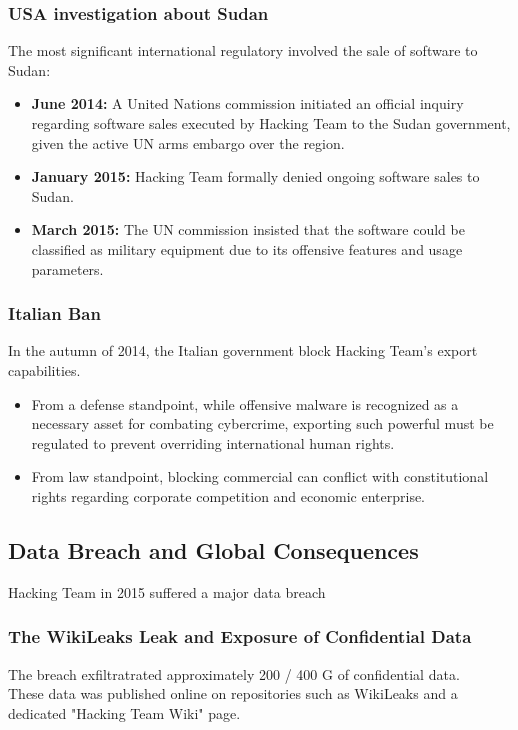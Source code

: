 \subsubsection*{USA investigation about Sudan}
The most significant international regulatory involved the sale of software to Sudan:
\begin{itemize}
    \item \textbf{June 2014:} A United Nations commission initiated an official inquiry regarding software sales executed by Hacking Team to the Sudan government, given the active UN arms embargo over the region.
    \item \textbf{January 2015:} Hacking Team formally denied ongoing software sales to Sudan.
    \item \textbf{March 2015:} The UN commission insisted that the software could be classified as military equipment due to its offensive features and usage parameters.
\end{itemize}


\subsubsection*{Italian Ban}
In the autumn of 2014, the Italian government block Hacking Team's export capabilities. 
\begin{itemize}
    \item From a defense standpoint, while offensive malware is recognized as a necessary asset for combating cybercrime, exporting such powerful must be regulated to prevent overriding international human rights.
    \item From law standpoint, blocking commercial can conflict with constitutional rights regarding corporate competition and economic enterprise.
\end{itemize}


\subsection{Data Breach and Global Consequences}
Hacking Team in 2015 suffered a major data breach

\subsubsection*{The WikiLeaks Leak and Exposure of Confidential Data}
The breach exfiltratrated approximately 200 / 400 G of confidential data.\\
These data was published online on repositories such as WikiLeaks and a dedicated "Hacking Team Wiki" page.
\medskip

